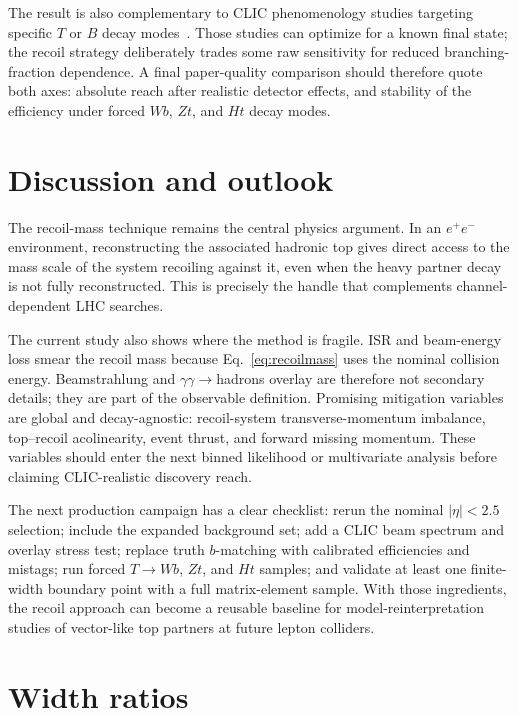 \documentclass[a4paper,11pt]{article}
\begin{document}
The result is also complementary to CLIC phenomenology studies targeting
specific $T$ or $B$ decay modes~\cite{Han:2022exx,Han:2022mzp}.  Those studies
can optimize for a known final state; the recoil strategy deliberately trades
some raw sensitivity for reduced branching-fraction dependence.  A final
paper-quality comparison should therefore quote both axes: absolute reach after
realistic detector effects, and stability of the efficiency under forced
$Wb$, $Zt$, and $Ht$ decay modes.

\section{Discussion and outlook}
\label{sec:outlook}

The recoil-mass technique remains the central physics argument.  In an
$e^+e^-$ environment, reconstructing the associated hadronic top gives direct
access to the mass scale of the system recoiling against it, even when the
heavy partner decay is not fully reconstructed.  This is precisely the handle
that complements channel-dependent LHC searches.

The current study also shows where the method is fragile.  ISR and beam-energy
loss smear the recoil mass because Eq.~\eqref{eq:recoilmass} uses the nominal
collision energy.  Beamstrahlung and $\gamma\gamma\to$hadrons overlay are
therefore not secondary details; they are part of the observable definition.
Promising mitigation variables are global and decay-agnostic: recoil-system
transverse-momentum imbalance, top--recoil acolinearity, event thrust, and
forward missing momentum.  These variables should enter the next binned
likelihood or multivariate analysis before claiming CLIC-realistic discovery
reach.

The next production campaign has a clear checklist: rerun the nominal
$|\eta|<2.5$ selection; include the expanded background set; add a CLIC beam
spectrum and overlay stress test; replace truth $b$-matching with calibrated
efficiencies and mistags; run forced $T\to Wb$, $Zt$, and $Ht$ samples; and
validate at least one finite-width boundary point with a full matrix-element
sample.  With those ingredients, the recoil approach can become a reusable
baseline for model-reinterpretation studies of vector-like top partners at
future lepton colliders.

\appendix

\section{Width ratios}
\label{app:widths}

\end{document}
